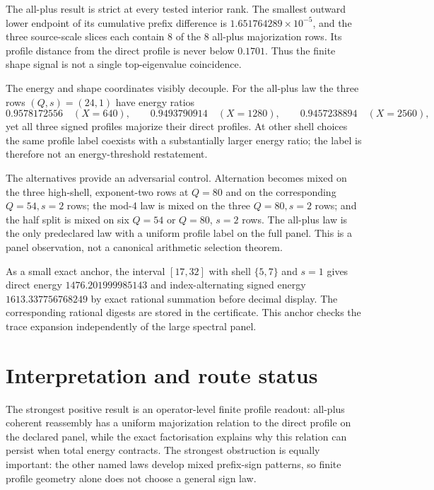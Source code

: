\documentclass[10pt]{article}
\begin{document}
The all-plus result is strict at every tested interior rank.  The smallest
outward lower endpoint of its cumulative prefix difference is
\(1.651764289\times10^{-5}\), and the three source-scale slices each contain
8 of the 8 all-plus majorization rows.  Its profile distance from the direct
profile is never below \(0.1701\).  Thus the finite shape signal is not a
single top-eigenvalue coincidence.

The energy and shape coordinates visibly decouple.  For the all-plus law the
three rows \((Q,s)=(24,1)\) have energy ratios
\[
 0.9578172556\quad (X=640),\qquad
 0.9493790914\quad (X=1280),\qquad
 0.9457238894\quad (X=2560),
\]
yet all three signed profiles majorize their direct profiles.  At other shell
choices the same profile label coexists with a substantially larger energy
ratio; the label is therefore not an energy-threshold restatement.

The alternatives provide an adversarial control.  Alternation becomes mixed
on the three high-shell, exponent-two rows at $Q=80$ and on the corresponding
$Q=54,s=2$ rows; the mod-4 law is mixed on the three $Q=80,s=2$ rows; and the
half split is mixed on six $Q=54$ or $Q=80$, $s=2$ rows.  The all-plus law is
the only predeclared law with a uniform profile label on the full panel.  This
is a panel observation, not a canonical arithmetic selection theorem.

As a small exact anchor, the interval $[17,32]$ with shell $\{5,7\}$ and
$s=1$ gives direct energy
\(1476.201999985143\) and index-alternating signed energy
\(1613.337756768249\) by exact rational summation before decimal display.
The corresponding rational digests are stored in the certificate.  This
anchor checks the trace expansion independently of the large spectral panel.

\section{Interpretation and route status}

The strongest positive result is an operator-level finite profile readout:
all-plus coherent reassembly has a uniform majorization relation to the
direct profile on the declared panel, while the exact factorisation explains
why this relation can persist when total energy contracts.  The strongest
obstruction is equally important: the other named laws develop mixed
prefix-sign patterns, so finite profile geometry alone does not choose a
general sign law.
\end{document}
